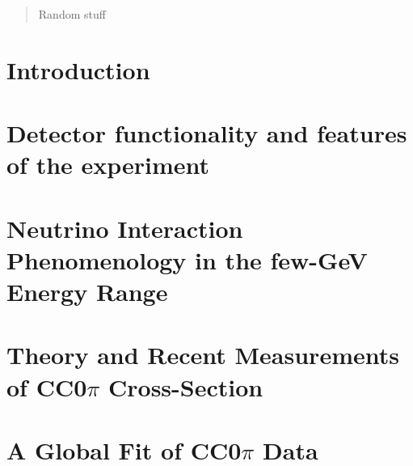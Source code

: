 \documentclass[11pt]{article}
\begin{document}
\vspace{6mm}
\begin{abstract}
    Random stuff
\end{abstract}
\newpage
\section{Introduction}
\label{sec:intro}



\section{Detector functionality and features of the experiment}
\label{sec:LArTPC}



\section{Neutrino Interaction Phenomenology in the few-GeV Energy Range}
\label{sec:NIP}



\section{Theory and Recent Measurements of CC0\( \pi \) Cross-Section}
\label{sec:XSec}



\section{A Global Fit of CC0\( \pi \) Data}
\label{sec:GF}
\end{document}
